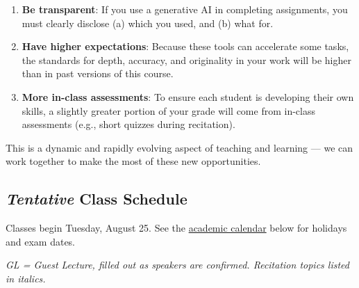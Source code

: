 \documentclass[
  letterpaper,
  DIV=11,
  numbers=noendperiod]{scrartcl}
\providecommand{\tightlist}{%
  \setlength{\itemsep}{0pt}\setlength{\parskip}{0pt}}
\begin{document}
\begin{enumerate}
\def\labelenumi{\arabic{enumi}.}
\tightlist
\item
  \textbf{Be transparent}: If you use a generative AI in completing
  assignments, you must clearly disclose (a) which you used, and (b)
  what for.
\item
  \textbf{Have higher expectations}: Because these tools can accelerate
  some tasks, the standards for depth, accuracy, and originality in your
  work will be higher than in past versions of this course.
\item
  \textbf{More in-class assessments}: To ensure each student is
  developing their own skills, a slightly greater portion of your grade
  will come from in-class assessments (e.g., short quizzes during
  recitation).
\end{enumerate}

This is a dynamic and rapidly evolving aspect of teaching and learning
--- we can work together to make the most of these new opportunities.

\subsection{\texorpdfstring{\emph{Tentative} Class
Schedule}{Tentative Class Schedule}}\label{tentative-class-schedule}

Classes begin Tuesday, August 25. See the
\hyperref[academic-calendar]{academic calendar} below for holidays and
exam dates.

\emph{GL = Guest Lecture, filled out as speakers are confirmed.
Recitation topics listed in italics.}
\end{document}
